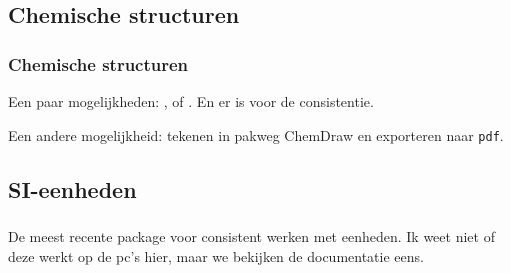 \subsection{Chemische structuren}
\begin{frame}
  \frametitle{Chemische structuren}

  Een paar mogelijkheden: ,  of . En er is  voor de consistentie.

  Een andere mogelijkheid: tekenen in pakweg ChemDraw en exporteren naar \texttt{pdf}.
\end{frame}


\subsection{SI-eenheden}
\begin{frame}
  \frametitle{}

  De meest recente package voor consistent werken met eenheden. Ik weet niet of deze werkt op de pc's hier, maar we bekijken de documentatie eens.
\end{frame}
